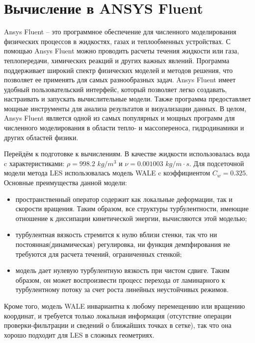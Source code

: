\section{Вычисление в ANSYS Fluent}
	Ansys Fluent -- это программное обеспечение для численного моделирования физических процессов в жидкостях, газах и теплообменных устройствах. С помощью Ansys Fluent можно проводить расчеты течения жидкости или газа, теплопередачи, химических реакций и других важных явлений. Программа поддерживает широкий спектр физических моделей и методов решения, что позволяет ее применять для самых разнообразных задач. Ansys Fluent имеет удобный пользовательский интерфейс, который позволяет легко создавать, настраивать и запускать вычислительные модели. Также программа предоставляет мощные инструменты для анализа результатов и визуализации данных. В целом, Ansys Fluent является одной из самых популярных и мощных программ для численного моделирования в области тепло- и массопереноса, гидродинамики и других областей физики.
	
	Перейдём к подготовке к вычислениям. В качестве жидкости использовалась вода c характеристиками: $\rho = 998.2$ $kg/m^3$ и $\nu = 0.001003$ $kg/m\cdot s$. Для подсеточной модели метода LES использовалась модель WALE c коэффициентом $C_w = 0.325$. Основные преимущества данной модели:
	\begin{itemize}
		\item пространственный оператор содержит как локальные деформации, так и скорости вращения. Таким образом, все структуры турбулентности, имеющие отношение к диссипации кинетической энергии, вычисляются этой моделью;
		\item турбулентная вязкость стремится к нулю вблизи стенки, так что ни постоянная(динамическая) регулировка, ни функция демпфирования не требуются для расчета течений, ограниченных стенкой;
		\item модель дает нулевую турбулентную вязкость при чистом сдвиге. Таким образом, он может воспроизвести процесс перехода от ламинарного к турбулентному потоку за счет роста линейных неустойчивых режимов. 
	\end{itemize}
	Кроме того, модель WALE инвариантна к любому перемещению или вращению координат, и требуется только локальная информация (отсутствие операции проверки-фильтрации и сведений о ближайших точках в сетке), так что она хорошо подходит для LES в сложных геометриях\cite{Nicoud1999}.
	
